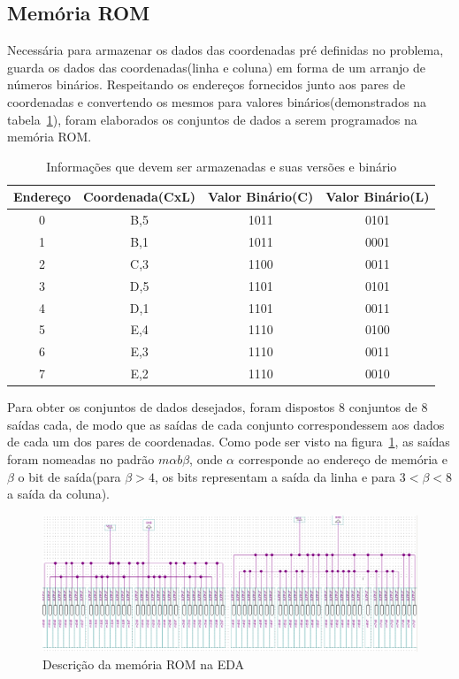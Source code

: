 \documentclass[12pt]{article}
\begin{document}
\subsection{Memória ROM}

Necessária para armazenar os dados das coordenadas pré definidas no problema, guarda os dados das coordenadas(linha e coluna) em forma de um arranjo de números binários. Respeitando os endereços fornecidos junto aos pares de coordenadas e convertendo os mesmos para valores binários(demonstrados na tabela~\ref{tab:rom-memory}), foram elaborados os conjuntos de dados a serem programados na memória ROM.

\begin{table}[!htbp]
\centering
\begin{tabular}{||c||c||c||c||}
\hline 
\rule[-1ex]{0pt}{2.5ex} Endereço & Coordenada(CxL) & Valor Binário(C) & Valor Binário(L) \\ 
\hline 
\hline
\rule[-1ex]{0pt}{2.5ex} 0 & B,5 & 1011 & 0101 \\ 
\hline 
\rule[-1ex]{0pt}{2.5ex} 1 & B,1 & 1011 & 0001 \\ 
\hline 
\rule[-1ex]{0pt}{2.5ex} 2 & C,3 & 1100 & 0011 \\ 
\hline 
\rule[-1ex]{0pt}{2.5ex} 3 & D,5 & 1101 & 0101 \\ 
\hline 
\rule[-1ex]{0pt}{2.5ex} 4 & D,1 & 1101 & 0011 \\ 
\hline 
\rule[-1ex]{0pt}{2.5ex} 5 & E,4 & 1110 & 0100 \\ 
\hline 
\rule[-1ex]{0pt}{2.5ex} 6 & E,3 & 1110 & 0011 \\ 
\hline 
\rule[-1ex]{0pt}{2.5ex} 7 & E,2 & 1110 & 0010 \\ 
\hline 
\end{tabular} 
\caption{Informações que devem ser armazenadas e suas versões e binário}
\label{tab:rom-memory}
\end{table}

Para obter os conjuntos de dados desejados, foram dispostos 8 conjuntos de 8 saídas cada, de modo que as saídas de cada conjunto correspondessem aos dados de cada um dos pares de coordenadas. Como pode ser visto na figura~\ref{fig:mem-rom}, as saídas foram nomeadas no padrão $m\alpha b\beta$, onde $\alpha$ corresponde ao endereço de memória e $\beta$ o bit de saída(para $\beta>4$, os bits representam a saída da linha e para $3<\beta<8$ a saída da coluna).

\begin{figure}[!htbp]
\centering
\includegraphics[width=.8\textwidth]{img/rom-memory.png}
\caption{Descrição da memória ROM na EDA}
\label{fig:mem-rom}
\end{figure}
\end{document}
